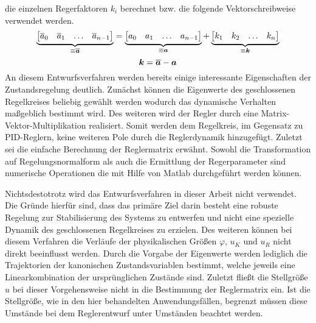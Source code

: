 die einzelnen Regerfaktoren $k_i$ berechnet bzw. die folgende Vektorschreibweise verwendet werden.
\begin{equation}
\underbrace{
\begin{bmatrix}
\overline{a}_0 & \overline{a}_1 & \hdots &\overline{a}_{n-1}
\end{bmatrix}}_{\equiv \boldsymbol{\overline{a}}}
=
\underbrace{
\begin{bmatrix}
a_0 & a_1 & \hdots & a_{n-1}
\end{bmatrix}}_{\equiv \boldsymbol{a}}
+
\underbrace{
\begin{bmatrix}
k_1 & k_2 & \hdots & k_n
\end{bmatrix}}_{\equiv \boldsymbol{k}}
\end{equation}
\begin{equation}
\boldsymbol{k} = \boldsymbol{\overline{a}} - \boldsymbol{a}
\end{equation}
An diesem Entwurfsverfahren werden bereits einige interessante Eigenschaften der Zustandsregelung deutlich. Zunächst können die Eigenwerte des geschlossenen Regelkreises beliebig gewählt werden wodurch das dynamische Verhalten maßgeblich bestimmt wird. Des weiteren wird der Regler durch eine Matrix-Vektor-Multiplikation realisiert. Somit werden dem Regelkreis, im Gegensatz zu PID-Reglern, keine weiteren Pole durch die Reglerdynamik hinzugefügt. Zuletzt sei die einfache Berechnung der Reglermatrix erwähnt. Sowohl die Transformation auf Regelungsnormalform als auch die Ermittlung der Regerparameter sind numerische Operationen die mit Hilfe von Matlab durchgeführt werden können.

Nichtsdestotrotz wird das Entwurfsverfahren in dieser Arbeit nicht verwendet. Die Gründe hierfür sind, dass das primäre Ziel darin besteht eine robuste Regelung zur Stabilisierung des Systems zu entwerfen und nicht eine spezielle Dynamik des geschlossenen Regelkreises zu erzielen. Des weiteren können bei diesem Verfahren die Verläufe der physikalischen Größen $\varphi$, $u_K$ und $u_R$ nicht direkt beeinflusst werden. Durch die Vorgabe der Eigenwerte werden lediglich die Trajektorien der kanonischen Zustandsvariablen bestimmt, welche jeweils eine Linearkombination der ursprünglichen Zustände sind. Zuletzt fließt die Stellgröße $u$ bei dieser Vorgehensweise nicht in die Bestimmung der Reglermatrix ein. Ist die Stellgröße, wie in den hier behandelten Anwendungsfällen, begrenzt müssen diese Umstände bei dem Reglerentwurf unter Umständen beachtet werden.

